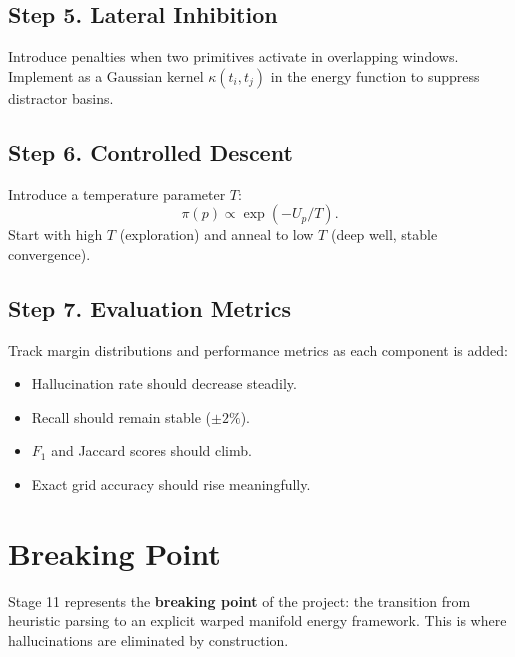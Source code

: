 \documentclass{article}
\begin{document}
\subsection*{Step 5. Lateral Inhibition}
Introduce penalties when two primitives activate in overlapping windows. Implement as a
Gaussian kernel $\kappa(t_i, t_j)$ in the energy function to suppress distractor basins.

\subsection*{Step 6. Controlled Descent}
Introduce a temperature parameter $T$:
\begin{equation}
\pi(p) \propto \exp(-U_p / T).
\end{equation}
Start with high $T$ (exploration) and anneal to low $T$ (deep well, stable convergence).

\subsection*{Step 7. Evaluation Metrics}
Track margin distributions and performance metrics as each component is added:
\begin{itemize}
    \item Hallucination rate should decrease steadily.
    \item Recall should remain stable ($\pm 2\%$).
    \item $F_1$ and Jaccard scores should climb.
    \item Exact grid accuracy should rise meaningfully.
\end{itemize}

\section*{Breaking Point}
Stage 11 represents the \textbf{breaking point} of the project: the transition from
heuristic parsing to an explicit warped manifold energy framework. This is where
hallucinations are eliminated by construction.
\end{document}
